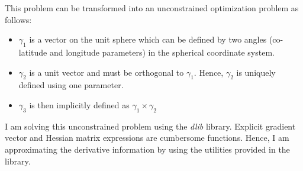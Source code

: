 \documentclass[a4paper,10pt]{report}
\numberwithin{equation}{chapter}
\begin{document}

\noindent This problem can be transformed into an unconstrained optimization problem as follows:
\begin{itemize}
\item $\gamma_1$ is a vector on the unit sphere which can be defined by two angles (co-latitude and longitude parameters)
in the spherical coordinate system.
\item $\gamma_2$ is a unit vector and must be orthogonal to $\gamma_1$. Hence, $\gamma_2$
is uniquely defined using one parameter. 
\item $\gamma_3$ is then implicitly defined as $\gamma_1 \times \gamma_2$
\end{itemize}
I am solving this unconstrained problem using the \emph{dlib} library.
Explicit gradient vector and Hessian matrix expressions
are cumbersome functions. Hence, I am approximating the derivative information
by using the utilities provided in the library.
\end{document}
